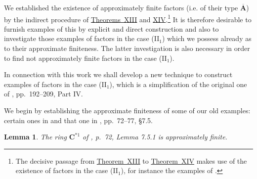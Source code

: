 \documentclass[b5paper,twoside]{article}
\theoremstyle{mvnplain}
\newtheorem{lemma}{Lemma}[section]
\begin{document}

We established the existence of approximately finite factors (i.e. of their
type \(\overline{\mathbf A}\)) by the indirect procedure of
\hyperref[thm:XIII]{\mbox{Theorems XIII}} and
\hyperref[thm:XIV]{\mbox{XIV}}.\footnote{The decisive
passage from \hyperref[thm:XIII]{\mbox{Theorem XIII}} to
\hyperref[thm:XIV]{\mbox{Theorem XIV}} makes use
of the existence of factors in the case (II\(_1\)), for instance the examples
of \cite{ref5}.} It is therefore desirable to furnish examples of
this by explicit and direct construction and also to investigate those examples
of factors in the case (II\(_1\)) which we possess already as to their
approximate finiteness. The latter investigation is also necessary in order to
find not approximately finite factors in the case (II\(_1\)).

In connection with this work we shall develop a new technique to construct
examples of factors in the case (II\(_1\)), which is a simplification of the
original one of \cite{ref5}, pp.~192--209, Part IV.

We begin by establishing the approximate finiteness of some of our old
examples: certain ones in \cite{ref5} and that one in
\cite{ref7}, pp.~72--77, \S7.5.


\begin{lemma}\label{lem:5.2.1}
The ring \(\mathbf C^{*1}\) of \cite{ref7}, p.~72, Lemma 7.5.1 is
approximately finite.
\end{lemma}
\end{document}
